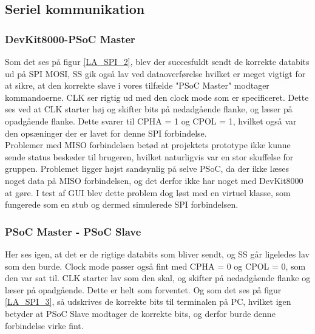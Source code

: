 \subsection{Seriel kommunikation}
\subsubsection{DevKit8000-PSoC Master}

Som det ses på figur \ref{LA_SPI_2}, blev der succesfuldt sendt de korrekte databits ud på SPI MOSI, SS gik også lav ved dataoverførelse hvilket er meget vigtigt
for at sikre, at den korrekte slave i vores tilfælde "PSoC Master" modtager kommandoerne. CLK ser rigtig ud med den clock mode som er specificeret.
Dette ses ved at CLK starter høj og skifter bits på nedadgående flanke, og læser på opadgående flanke. Dette svarer til CPHA = 1 og CPOL = 1, hvilket også var 
den opsæninger der er lavet for denne SPI forbindelse.\\

Problemer med MISO forbindelsen betød at projektets prototype ikke kunne sende status beskeder til brugeren, hvilket naturligvis var en stor skuffelse for
gruppen. Problemet ligger højst sandsynlig på selve PSoC, da der ikke læses noget data på MISO forbindelsen, og det derfor ikke har noget med DevKit8000 at gøre.
I test af GUI blev dette problem dog løst med en virtuel klasse, som fungerede som en stub og dermed simulerede SPI forbindelsen.


\subsubsection{PSoC Master - PSoC Slave}

Her ses igen, at det er de rigtige databits som bliver sendt, og SS går ligeledes lav som den burde. Clock mode passer også fint med 
CPHA = 0 og CPOL = 0, som den var sat til. CLK starter lav som den skal, og skifter på nedadgående flanke og læser på opadgående. Dette er helt som forventet. 
Og som det ses på figur \ref{LA_SPI_3}, så udskrives de korrekte bits til terminalen på PC, hvilket igen betyder at PSoC Slave modtager de korrekte bits, 
og derfor burde denne forbindelse virke fint.